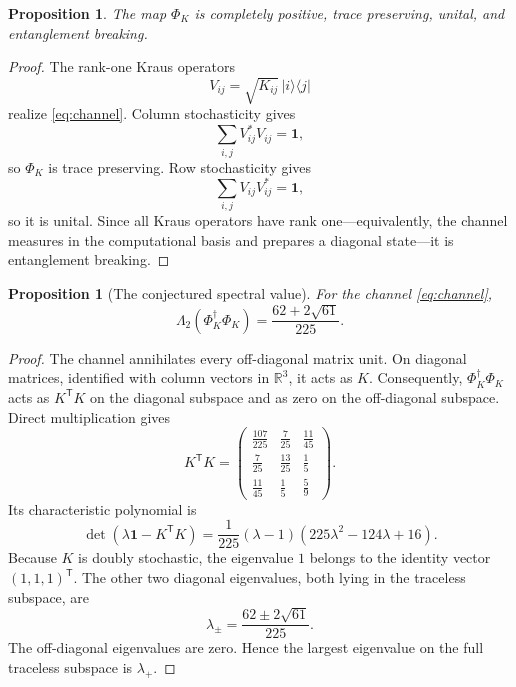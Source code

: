 \documentclass[11pt]{amsart}
\newtheorem{proposition}[theorem]{Proposition}
\theoremstyle{definition}
\theoremstyle{remark}
\newcommand{\Id}{\mathbf 1}
\newcommand{\PhiK}{\Phi_K}
\begin{document}
\begin{proposition}\label{prop:channel}
The map $\PhiK$ is completely positive, trace preserving, unital, and entanglement breaking.
\end{proposition}

\begin{proof}
The rank-one Kraus operators
\[
 V_{ij}=\sqrt{K_{ij}}\,|i\rangle\langle j|
\]
realize \eqref{eq:channel}. Column stochasticity gives
\[
 \sum_{i,j}V_{ij}^*V_{ij}=\Id,
\]
so $\PhiK$ is trace preserving. Row stochasticity gives
\[
 \sum_{i,j}V_{ij}V_{ij}^*=\Id,
\]
so it is unital. Since all Kraus operators have rank one---equivalently, the channel measures in the computational basis and prepares a diagonal state---it is entanglement breaking.
\end{proof}

\begin{proposition}[The conjectured spectral value]\label{prop:spectral}
For the channel \eqref{eq:channel},
\begin{equation}\label{eq:spectralvalue}
 \Lambda_2(\PhiK^\dagger\PhiK)
 =\frac{62+2\sqrt{61}}{225}.
\end{equation}
\end{proposition}

\begin{proof}
The channel annihilates every off-diagonal matrix unit. On diagonal matrices, identified with column vectors in $\mathbb R^3$, it acts as $K$. Consequently, $\PhiK^\dagger\PhiK$ acts as $K^{\mathsf T}K$ on the diagonal subspace and as zero on the off-diagonal subspace. Direct multiplication gives
\begin{equation}\label{eq:KtK}
 K^{\mathsf T}K=
 \begin{pmatrix}
  \frac{107}{225}&\frac7{25}&\frac{11}{45}\\[1mm]
  \frac7{25}&\frac{13}{25}&\frac15\\[1mm]
  \frac{11}{45}&\frac15&\frac59
 \end{pmatrix}.
\end{equation}
Its characteristic polynomial is
\begin{equation}\label{eq:charpoly}
 \det(\lambda\Id-K^{\mathsf T}K)
 =\frac1{225}(\lambda-1)
   (225\lambda^2-124\lambda+16).
\end{equation}
Because $K$ is doubly stochastic, the eigenvalue $1$ belongs to the identity vector $(1,1,1)^{\mathsf T}$. The other two diagonal eigenvalues, both lying in the traceless subspace, are
\[
 \lambda_\pm=\frac{62\pm2\sqrt{61}}{225}.
\]
The off-diagonal eigenvalues are zero. Hence the largest eigenvalue on the full traceless subspace is $\lambda_+$.
\end{proof}
\end{document}
